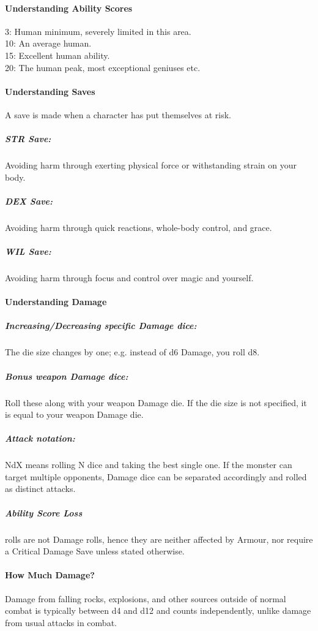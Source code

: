 \documentclass[itdr]{subfiles}
\begin{document}
\vfill

\paragraph{Understanding Ability Scores}
3: Human minimum, severely limited in this area.\\
10: An average human.\\
15: Excellent human ability.\\
20: The human peak, most exceptional geniuses etc.

\vfill

\paragraph{Understanding Saves}
A save is made  when a character has put themselves at risk.

\subparagraph{STR Save:} Avoiding harm through exerting physical force or withstanding strain on your body.

\subparagraph{DEX Save:} Avoiding harm through quick reactions, whole-body control, and grace.

\subparagraph{WIL Save:} Avoiding harm through focus and control over magic and yourself.

\vfill
\break

\paragraph{Understanding Damage}
\subparagraph{Increasing/Decreasing specific Damage dice:} The die size changes by one; e.g. instead of d6 Damage, you roll d8.

\subparagraph{Bonus weapon Damage dice:} Roll these along with your weapon Damage die. If the die size is not \mbox{specified}, it is equal to your weapon Damage die.

\subparagraph{Attack notation:} NdX means rolling N dice and taking the best single one. If the monster can target multiple opponents, Damage dice can be separated accordingly and rolled as distinct attacks.

\subparagraph{Ability Score Loss} rolls are not Damage rolls, hence they are neither affected by Armour, nor require a Critical Damage Save unless stated otherwise.

\vfill

\paragraph{How Much Damage?}
Damage from falling rocks, explosions, and other sources outside of normal combat is typically between d4 and d12 and counts independently, unlike damage from usual attacks in combat.
\end{document}
